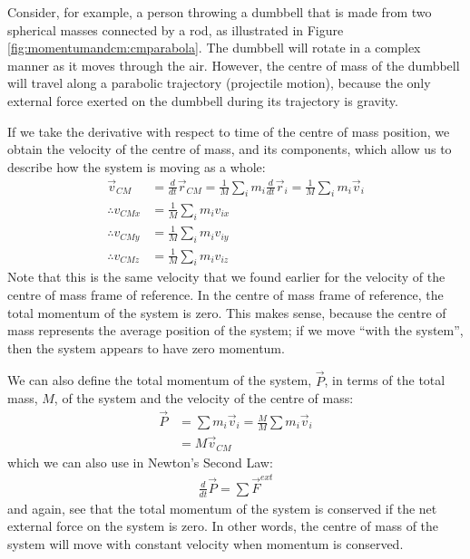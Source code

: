 Consider, for example, a person throwing a dumbbell that is made from two spherical masses connected by a rod, as illustrated in Figure \ref{fig:momentumandcm:cmparabola}. The dumbbell will rotate in a complex manner as it moves through the air. However, the centre of mass of the dumbbell will travel along a parabolic trajectory (projectile motion), because the only external force exerted on the dumbbell during its trajectory is gravity.


If we take the derivative with respect to time of the centre of mass position, we obtain the velocity of the centre of mass, and its components, which allow us to describe how the system is moving as a whole:
\begin{align}
\vec v_{CM} &= \frac{d}{dt}\vec r_{CM} = \frac{1}{M}\sum_i m_i\frac{d}{dt}\vec r_i=  \frac{1}{M}\sum_i m_i\vec v_i\nonumber\\
\therefore v_{CMx} &= \frac{1}{M}\sum_i m_i v_{ix}\nonumber\\
\therefore v_{CMy} &= \frac{1}{M}\sum_i m_i v_{iy}\nonumber\\
\therefore v_{CMz} &= \frac{1}{M}\sum_i m_i v_{iz}
\end{align}
Note that this is the same velocity that we found earlier for the velocity of the centre of mass frame of reference. In the centre of mass frame of reference, the total momentum of the system is zero. This makes sense, because the centre of mass represents the average position of the system; if we move ``with the system'', then the system appears to have zero momentum.

We can also define the total momentum of the system, $\vec P$, in terms of the total mass, $M$, of the system and the velocity of the centre of mass:
\begin{align*}
\vec P &= \sum m_i \vec v_i = \frac{M}{M}\sum m_i \vec v_i\\
&=M\vec v_{CM}
\end{align*}
which we can also use in Newton's Second Law:
\begin{align*}
\frac{d}{dt}\vec P = \sum \vec F^{ext}
\end{align*}
and again, see that the total momentum of the system is conserved if the net external force on the system is zero. In other words, the centre of mass of the system will move with constant velocity when momentum is conserved.

